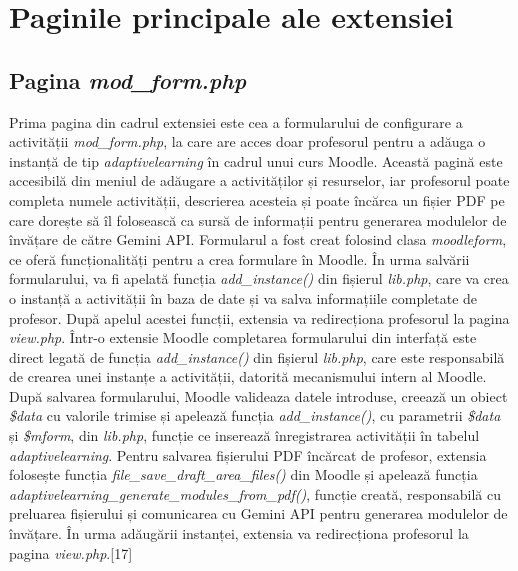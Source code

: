\section{Paginile principale ale extensiei}

\subsection{Pagina \textit{mod\_form.php}}

Prima pagina din cadrul extensiei este cea a formularului de configurare a activității \textit{mod\_form.php}, la care are acces doar profesorul pentru a adăuga o instanță de tip \textit{adaptivelearning} în cadrul unui curs 
Moodle. Această pagină este accesibilă din meniul de adăugare a activităților și resurselor, iar profesorul poate completa numele activității, descrierea acesteia și poate încărca un fișier 
PDF pe care dorește să îl folosească ca sursă de informații pentru generarea modulelor de învățare de către Gemini API. Formularul a fost creat folosind clasa \textit{moodleform}, 
ce oferă funcționalități pentru a crea formulare în Moodle. În urma salvării formularului, va fi apelată funcția \textit{add\_instance()} din fișierul \textit{lib.php}, care va crea o 
instanță a activității în baza de date și va salva informațiile completate de profesor. După apelul acestei funcții, extensia va redirecționa profesorul la pagina \textit{view.php}. 
Într-o extensie Moodle completarea formularului din interfață este direct legată de funcția \textit{add\_instance()} din fișierul \textit{lib.php}, care este responsabilă de crearea unei 
instanțe a activității, datorită mecanismului intern al Moodle. După salvarea formularului, Moodle valideaza datele introduse, creează un obiect \textit{\$data} cu valorile trimise și apelează 
funcția \textit{add\_instance()}, cu parametrii \textit{\$data} și \textit{\$mform}, din \textit{lib.php}, funcție ce inserează înregistrarea activității în tabelul \textit{adaptivelearning}. 
Pentru salvarea fișierului PDF încărcat de profesor, extensia folosește funcția \textit{file\_save\_draft\_area\_files()} din Moodle și apelează funcția 
\textit{adaptivelearning\_generate\_modules\_from\_pdf()}, funcție creată, responsabilă cu preluarea fișierului și comunicarea cu Gemini API pentru generarea modulelor de învățare. În urma 
adăugă\-rii instanței, extensia va redirecționa profesorul la pagina \textit{view.php}.[17]


